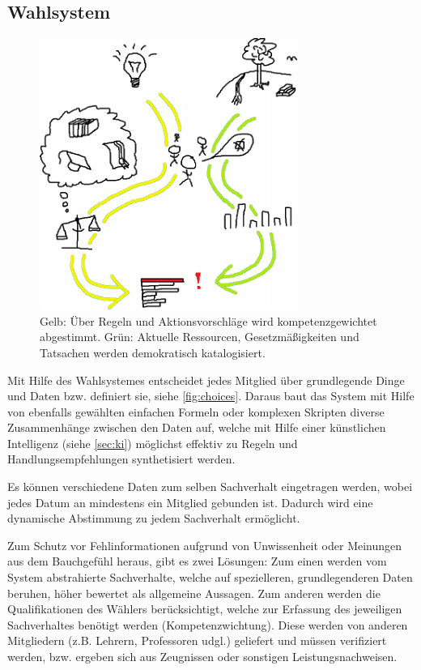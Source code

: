 \subsection{Wahlsystem}\label{sec:maintenance/voting}

\begin{figure}
\caption[Wahlsystem (Übersicht)]{Gelb: Über Regeln und Aktionsvorschläge wird kompetenzgewichtet abgestimmt. Grün: Aktuelle Ressourcen, Gesetzmäßigkeiten und Tatsachen werden demokratisch katalogisiert.}
\label{fig:choices}
\begin{center}
\includegraphics[width=0.75\textwidth]{gfx/speciosgraph2_small.png}
\end{center}
\end{figure}

Mit Hilfe des Wahlsystemes entscheidet jedes Mitglied über grundlegende Dinge und Daten bzw. definiert sie, siehe \vref{fig:choices}. Daraus baut das System mit Hilfe von ebenfalls gewählten einfachen Formeln oder komplexen Skripten diverse Zusammenhänge zwischen den Daten auf, welche mit Hilfe einer künstlichen Intelligenz (siehe \vref{sec:ki}) möglichst effektiv zu Regeln und Handlungsempfehlungen synthetisiert werden.

Es können verschiedene Daten zum selben Sachverhalt eingetragen werden, wobei jedes Datum an mindestens ein Mitglied gebunden ist. Dadurch wird eine dynamische Abstimmung zu jedem Sachverhalt ermöglicht.

Zum Schutz vor Fehlinformationen aufgrund von Unwissenheit oder Meinungen aus dem Bauchgefühl heraus, gibt es zwei Lösungen: Zum einen werden vom System abstrahierte Sachverhalte, welche auf spezielleren, grundlegenderen Daten beruhen, höher bewertet als allgemeine Aussagen. Zum anderen werden die Qualifikationen des Wählers berücksichtigt, welche zur Erfassung des jeweiligen Sachverhaltes benötigt werden (Kompetenzwichtung). Diese werden von anderen Mitgliedern (z.B. Lehrern, Professoren udgl.) geliefert und müssen verifiziert werden, bzw. ergeben sich aus Zeugnissen oder sonstigen Leistungsnachweisen.

